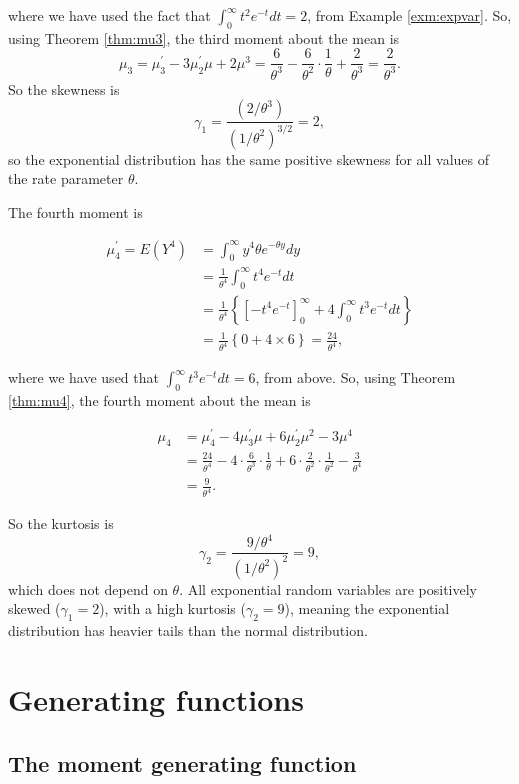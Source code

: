 \documentclass[]{book}
\theoremstyle{definition}
\theoremstyle{definition}
\theoremstyle{definition}
\theoremstyle{remark}
\begin{document}
where we have used the fact that \(\int_0^\infty t^2 e^{-t} dt = 2\),
from Example \ref{exm:expvar}. So, using Theorem \ref{thm:mu3}, the
third moment about the mean is
\[ \mu_3 = \mu_3^\prime - 3\mu_2^\prime \mu + 2 \mu^3
= \frac{6}{\theta^3} - \frac{6}{\theta^2} \cdot \frac{1}{\theta} + \frac{2}{\theta^3}
= \frac{2}{\theta^3}.\] So the skewness is
\[\gamma_1 = \frac{(2/ \theta^3)}{(1/ \theta^2)^{3/2}}
 = 2,\] so the exponential distribution has the same positive skewness
for all values of the rate parameter \(\theta\).

The fourth moment is

\begin{align*}
 \mu_4^\prime = E(Y^4) &= \int_0^\infty y^4 \theta e^{-\theta y} dy \\
 &= \frac{1}{\theta^4} \int_0^\infty t^4 e^{-t} dt \\
 &= \frac{1}{\theta^4} \left\{[-t^4 e^{-t}]_0^\infty + 
 4 \int_0^\infty t^3 e^{-t} dt \right\} \\
 &= \frac{1}{\theta^4} \left\{0 + 4 \times 6 \right\}
 = \frac{24}{\theta^4},
 \end{align*}

where we have used that \(\int_0^\infty t^3 e^{-t}dt = 6\), from above.
So, using Theorem \ref{thm:mu4}, the fourth moment about the mean is

\begin{align*}
\mu_4 &= \mu_4^\prime - 4 \mu_3^\prime \mu + 6 \mu_2^\prime \mu^2 - 3 \mu^4\\
&= \frac{24}{\theta^4} - 4 \cdot \frac{6}{\theta^3} \cdot \frac{1}{\theta}
+ 6 \cdot \frac{2}{\theta^2} \cdot \frac{1}{\theta^2}
- \frac{3}{\theta^4} \\
&= \frac{9}{\theta^4}.
\end{align*}

So the kurtosis is
\[\gamma_2 = \frac{9/\theta^4}{(1/\theta^2)^2} =  9,\] which does not
depend on \(\theta\). All exponential random variables are positively
skewed (\(\gamma_1 = 2\)), with a high kurtosis (\(\gamma_2 = 9\)),
meaning the exponential distribution has heavier tails than the normal
distribution.

\chapter{Generating functions}\label{genfuns}

\section{The moment generating
function}\label{the-moment-generating-function}
\end{document}
